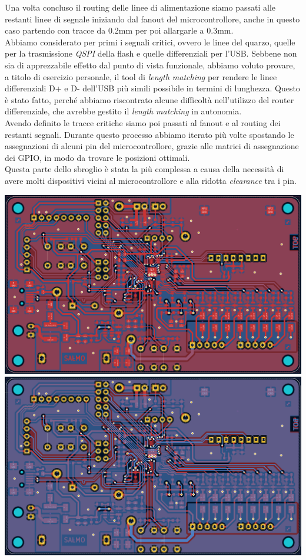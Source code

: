 \noindent Una volta concluso il routing delle linee di alimentazione siamo passati
alle restanti linee di segnale iniziando dal fanout del
microcontrollore, anche in questo caso partendo con tracce da 0.2mm per
poi allargarle a 0.3mm.\\
Abbiamo considerato per primi i segnali critici, ovvero le linee del
quarzo, quelle per la trasmissione \textit{QSPI} della flash e quelle
differenziali per l'USB. Sebbene non sia di apprezzabile effetto dal
punto di vista funzionale, abbiamo voluto provare, a titolo di esercizio
personale, il tool di \emph{length matching} per rendere le linee
differenziali D+ e D- dell'USB più simili possibile in termini di
lunghezza. Questo è stato fatto, perché abbiamo riscontrato alcune
difficoltà nell'utilizzo del router differenziale, che avrebbe gestito
il \emph{length matching} in autonomia.\\
Avendo definito le tracce critiche siamo poi passati al fanout e al
routing dei restanti segnali. Durante questo processo abbiamo iterato
più volte spostando le assegnazioni di alcuni pin del microcontrollore,
grazie alle matrici di assegnazione dei GPIO, in modo da trovare le
posizioni ottimali.\\
Questa parte dello sbroglio è stata la più complessa a causa della
necessità di avere molti dispositivi vicini al microcontrollore e alla
ridotta \emph{clearance} tra i pin.

\includegraphics[scale=0.16]{figures/image59.png}
\includegraphics[scale=0.16]{figures/image22.png}
\begin{center}
\captionsetup{type=figure}
\end{center}

